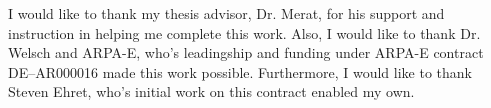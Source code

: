 I would like to thank my thesis advisor, Dr. Merat, for his support and instruction in helping me complete this work. Also, I would like to thank Dr. Welsch and ARPA-E, who's leadingship and funding under ARPA-E contract DE--AR000016 made this work possible. Furthermore, I would like to thank Steven Ehret, who's initial work on this contract enabled my own.

